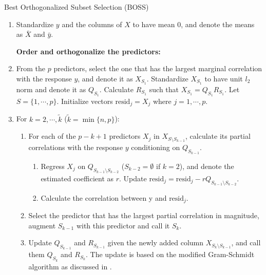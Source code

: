 \begin{algorithm}
	\caption{Best Orthogonalized Subset Selection (BOSS)}\label{alg:boss}
	\begin{enumerate}[label=\arabic*.]
		\item Standardize $y$ and the columns of $X$ to have mean $0$, and denote the means as $\bar{X}$ and $\bar{y}$.

		\textbf{Order and orthogonalize the predictors:}

		\item From the $p$ predictors, select the one that has the largest marginal correlation with the response $y$,  and denote it as $X_{S_1}$. Standardize $X_{S_1}$ to have unit $l_2$ norm and denote it as $Q_{S_1}$. Calculate $R_{S_1}$ such that $X_{S_1} = Q_{S_1} R_{S_1}$. Let $S=\{1,\cdots, p\}$. Initialize vectors $\text{resid}_j=X_j$ where $j=1,\cdots,p$.
		\item For $k=2,\cdots,\tilde{k}$ ($\tilde{k}=\min\{n,p\}$):
		\begin{enumerate}[label=\alph*.]
			\item For each of the $p-k+1$ predictors $X_j$ in $X_{S \setminus S_{k-1} }$, calculate its partial correlations with the response $y$ conditioning on $Q_{S_{k-1}}$. 

			\begin{enumerate}[label=a\arabic*.]
				\item Regress $X_j$ on $Q_{S_{k-1} \setminus S_{k-2}}$ ($S_{k-2}=\emptyset$ if $k=2$), and denote the estimated coefficient as $r$. Update $\text{resid}_j = \text{resid}_j - r Q_{S_{k-1} \setminus S_{k-2}}$.
				\item Calculate the correlation between y and $\text{resid}_j$.
			\end{enumerate}
			\item Select the predictor that has the largest partial correlation in magnitude, augment $S_{k-1}$ with this predictor and call it $S_{k}$.
			\item Update $Q_{S_{k-1}}$ and $R_{S_{k-1}}$ given the newly added column $X_{S_k \setminus S_{k-1}}$, and call them $Q_{S_k}$ and $R_{S_k}$. The update is based on the modified Gram-Schmidt algorithm as discussed in \citet{hammarling2008updating}.
		\end{enumerate}
		

\end{enumerate}
\end{algorithm}
